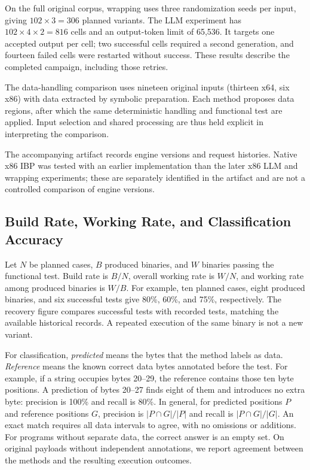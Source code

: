 On the full original corpus, wrapping uses three randomization seeds per
input, giving $102\times3=306$ planned variants. The LLM experiment has
$102\times4\times2=816$ cells and an output-token limit of 65,536.
It targets one accepted output per cell; two successful cells required a
second generation, and fourteen failed cells were restarted without success.
These results describe the completed campaign, including those retries.

The data-handling comparison uses nineteen original inputs (thirteen x64,
six x86) with data extracted by symbolic preparation. Each method proposes
data regions, after which the same deterministic handling and functional
test are applied. Input selection and shared processing are thus held
explicit in interpreting the comparison.

The accompanying artifact records engine versions and request histories.
Native x86 IBP was tested with an earlier implementation than the later
x86 LLM and wrapping experiments; these are separately identified in the
artifact and are not a controlled comparison of engine versions.

\subsection{Build Rate, Working Rate, and Classification Accuracy}
Let $N$ be planned cases, $B$ produced binaries, and $W$ binaries passing
the functional test. Build rate is $B/N$, overall working rate is $W/N$,
and working rate among produced binaries is $W/B$.
For example, ten planned cases, eight produced binaries, and six successful
tests give 80\%, 60\%, and 75\%, respectively. The recovery figure compares
successful tests with recorded tests, matching the available historical
records. A repeated execution of the same binary is not a new variant.

For classification, \emph{predicted} means the bytes that the method labels
as data. \emph{Reference} means the known correct data bytes annotated
before the test. For example, if a string occupies bytes 20--29, the
reference contains those ten byte positions. A prediction of bytes 20--27
finds eight of them and introduces no extra byte: precision is 100\%
and recall is 80\%. In general, for predicted positions $P$ and reference
positions $G$, precision is $|P\cap G|/|P|$ and recall is $|P\cap G|/|G|$.
An exact match requires all data intervals to agree, with no omissions or
additions. For programs without separate data, the correct answer is an
empty set. On original payloads without independent annotations, we report
agreement between the methods and the resulting execution outcomes.

